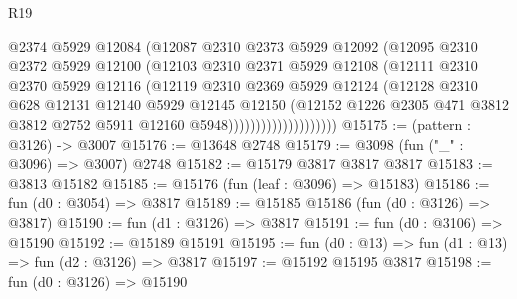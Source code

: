 \begin{lexlean}{R19}
\begin{coremodule}
                              @2374
                              @5929
                              @12084
                              (@12087
                                @2310
                                @2373
                                @5929
                                @12092
                                (@12095
                                  @2310
                                  @2372
                                  @5929
                                  @12100
                                  (@12103
                                    @2310
                                    @2371
                                    @5929
                                    @12108
                                    (@12111
                                      @2310
                                      @2370
                                      @5929
                                      @12116
                                      (@12119
                                        @2310
                                        @2369
                                        @5929
                                        @12124
                                        (@12128
                                          @2310
                                          @628
                                          @12131
                                          @12140
                                          @5929
                                          @12145
                                          @12150
                                          (@12152
                                            @1226
                                            @2305
                                            @471
                                            @3812
                                            @3812
                                            @2752
                                            @5911
                                            @12160
                                            @5948))))))))))))))))))))
@15175 := (pattern : @3126) -> @3007
@15176 := @13648 @2748
@15179 := @3098 (fun ("_" : @3096) => @3007) @2748
@15182 := @15179 @3817 @3817 @3817
@15183 := @3813 @15182
@15185 := @15176 (fun (leaf : @3096) => @15183)
@15186 := fun (d0 : @3054) => @3817
@15189 := @15185 @15186 (fun (d0 : @3126) => @3817)
@15190 := fun (d1 : @3126) => @3817
@15191 := fun (d0 : @3106) => @15190
@15192 := @15189 @15191
@15195 := fun (d0 : @13) => fun (d1 : @13) => fun (d2 : @3126) => @3817
@15197 := @15192 @15195 @3817
@15198 := fun (d0 : @3126) => @15190

\end{coremodule}
\end{lexlean}
